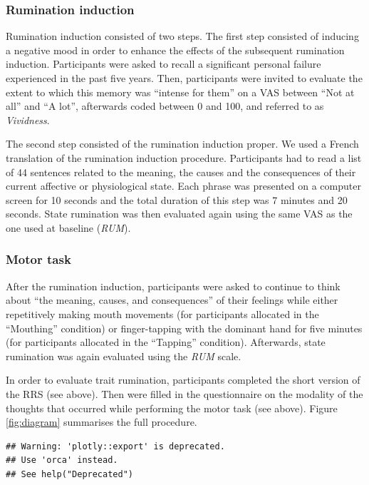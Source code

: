\documentclass[12pt,]{book}
\theoremstyle{definition}
\theoremstyle{definition}
\theoremstyle{definition}
\theoremstyle{remark}
\begin{document}
\subsubsection{Rumination induction}\label{rumination-induction}

Rumination induction consisted of two steps. The first step consisted of
inducing a negative mood in order to enhance the effects of the
subsequent rumination induction. Participants were asked to recall a
significant personal failure experienced in the past five years. Then,
participants were invited to evaluate the extent to which this memory
was ``intense for them'' on a VAS between ``Not at all'' and ``A lot'',
afterwards coded between 0 and 100, and referred to as \emph{Vividness}.

The second step consisted of the rumination induction proper. We used a
French translation of the \citet{Nolen-hoeksema1993} rumination
induction procedure. Participants had to read a list of 44 sentences
related to the meaning, the causes and the consequences of their current
affective or physiological state. Each phrase was presented on a
computer screen for 10 seconds and the total duration of this step was 7
minutes and 20 seconds. State rumination was then evaluated again using
the same VAS as the one used at baseline (\emph{RUM}).

\subsubsection{Motor task}\label{proc_supp}

After the rumination induction, participants were asked to continue to
think about ``the meaning, causes, and consequences'' of their feelings
while either repetitively making mouth movements (for participants
allocated in the ``Mouthing'' condition) or finger-tapping with the
dominant hand for five minutes (for participants allocated in the
``Tapping'' condition). Afterwards, state rumination was again evaluated
using the \emph{RUM} scale.

In order to evaluate trait rumination, participants completed the short
version of the RRS (see above). Then were filled in the questionnaire on
the modality of the thoughts that occurred while performing the motor
task (see above). Figure \ref{fig:diagram} summarises the full
procedure.

\begin{verbatim}
## Warning: 'plotly::export' is deprecated.
## Use 'orca' instead.
## See help("Deprecated")
\end{verbatim}
\end{document}
